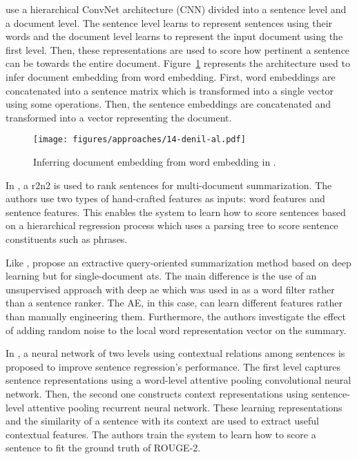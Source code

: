 \citet{14-denil-al} use a hierarchical ConvNet architecture (CNN) divided into a sentence level and a document level.
The sentence level learns to represent sentences using their words and the document level learns to represent the input document using the first level. 
Then, these representations are used to score how pertinent a sentence can be towards the entire document.
Figure~\ref{fig:14-denil-al} represents the architecture used to infer document embedding from word embedding. 
First, word embeddings are concatenated into a sentence matrix which is transformed into a single vector using some operations. 
Then, the sentence embeddings are concatenated and transformed into a vector representing the document.
%
\begin{figure}[!ht]
	\begin{center}
		\texttt{[image: figures/approaches/14-denil-al.pdf]} %
		\caption{Inferring document embedding from word embedding in \citep{14-denil-al}.}
		\label{fig:14-denil-al}
	\end{center}
\end{figure}

In \citep{15-cao-al}, a \ac{r2n2} is used to rank sentences for multi-document summarization. 
The authors use two types of hand-crafted features as inputs: word features and sentence features. 
This enables the system to learn how to score sentences based on a hierarchical regression process which uses a parsing tree to score sentence constituents such as phrases. 

Like \citet{15-zhong-al}, \citet{17-yousefiAzar-hamey} propose an extractive query-oriented summarization method based on deep learning but for single-document \ac{ats}.
The main difference is the use of an unsupervised approach with deep \ac{ae} which was used in \citet{15-zhong-al} as a word filter rather than a sentence ranker. 
The AE, in this case, can learn different features rather than manually engineering them.
Furthermore, the authors investigate the effect of adding random noise to the local word representation vector on the summary.

In \citep{17-ren-al}, a neural network of two levels using contextual relations among sentences is proposed to improve sentence regression's performance. 
The first level captures sentence representations using a word-level attentive pooling convolutional neural network. 
Then, the second one constructs context representations using sentence-level attentive pooling recurrent neural network. 
These learning representations and the similarity of a sentence with its context are used to extract useful contextual features. 
The authors train the system to learn how to score a sentence to fit the ground truth of ROUGE-2.

